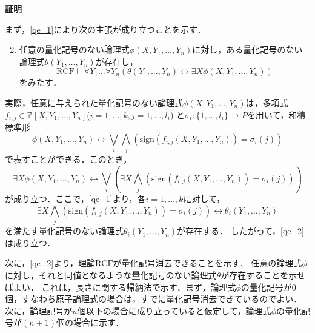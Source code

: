 \documentclass[uplatex, dvipdfmx]{jsarticle}
\makeatletter
\numberwithin{equation}{section}
\renewenvironment{proof}[1][\proofname]{\par
  \pushQED{\qed}%
  \normalfont \topsep6\p@\@plus6\p@\relax
  \trivlist
  \item\relax
  {\bfseries
  #1\@addpunct{.}}\hspace\labelsep\ignorespaces
}{
  \popQED\endtrivlist\@endpefalse
}
\newcommand{\Z}{\mathbb{Z}}
\newcommand{\RCF}{\mathrm{RCF}}
\newcommand{\sign}{\mathrm{sign}}
\newcommand{\map}[3]{{#1}\colon{#2}\rightarrow{#3}}
\theoremstyle{definition}
\renewcommand{\proofname}{\textbf{証明}}
\makeatother
\begin{document}
\begin{proof}
     まず，\ref{qe_1}により次の主張が成り立つことを示す．
     \begin{enumerate}
          \setcounter{enumi}{1}
          \item \label{qe_2}
          任意の量化記号のない論理式$\phi(X, Y_1, \dots, Y_n)$に対し，ある量化記号のない論理式$\theta(Y_1, \dots, Y_n)$が存在し，
          \begin{equation}
               \RCF \models \forall Y_1 \dots \forall Y_n(\theta(Y_1, \dots, Y_n) \leftrightarrow \exists X \phi(X, Y_1, \dots, Y_n))
          \end{equation}
          をみたす．
     \end{enumerate}
     実際，任意に与えられた量化記号のない論理式$\phi(X, Y_1, \dots, Y_n)$は，多項式$f_{i,j} \in \Z[X, Y_1, \dots, Y_n]$($i=1, \dots, k, j=1, \dots, l_i$)
     と$\map{\sigma_i}{\{1, \dots, l_i\}}{P}$を用いて，和積標準形
     \begin{equation}
          \phi(X, Y_1, \dots, Y_n) \leftrightarrow \bigvee_i \bigwedge_j (\sign(f_{i,j}(X, Y_1, \dots, Y_n)) = \sigma_i(j))
     \end{equation}
     で表すことができる．このとき，
     \begin{equation}
          \exists X \phi(X, Y_1, \dots, Y_n) \leftrightarrow \bigvee_i (\exists X \bigwedge_j (\sign(f_{i,j}(X, Y_1, \dots, Y_n)) = \sigma_i(j)))
     \end{equation}
     が成り立つ．ここで，\ref{qe_1}より，各$i=1, \dots, k$に対して，
     \begin{equation}
          \exists X \bigwedge_j (\sign(f_{i,j}(X, Y_1, \dots, Y_n)) = \sigma_i(j)) \leftrightarrow \theta_i(Y_1, \dots, Y_n)
     \end{equation}
     を満たす量化記号のない論理式$\theta_i(Y_1, \dots, Y_n)$が存在する．
     したがって，\ref{qe_2}は成り立つ．

     次に，\ref{qe_2}より，理論$\RCF$が量化記号消去できることを示す．
     任意の論理式$\phi$に対し，それと同値となるような量化記号のない論理式$\theta$が存在することを示せばよい．
     これは，長さに関する帰納法で示す．まず，論理式$\phi$の量化記号が0個，すなわち原子論理式の場合は，すでに量化記号消去できているのでよい．
     次に，論理記号が$n$個以下の場合に成り立っていると仮定して，論理式$\phi$の量化記号が$(n+1)$個の場合に示す．


\end{proof}
\end{document}
